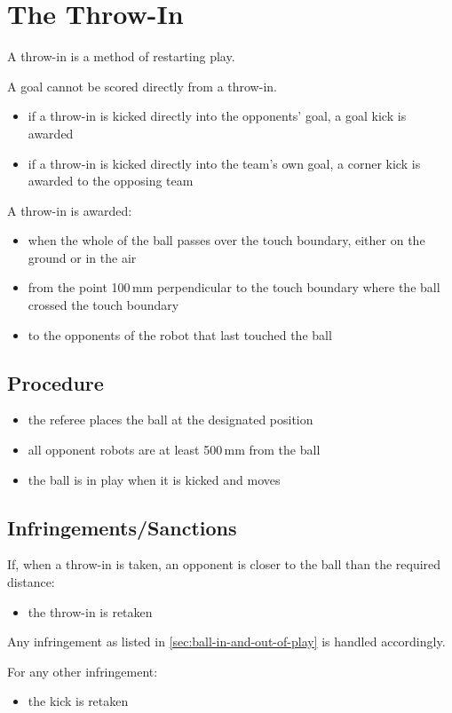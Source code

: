 \section{The Throw-In}\label{sec:throw-in}

A throw-in is a method of restarting play.

A goal cannot be scored directly from a throw-in.

\begin{itemize}
\item if a throw-in is kicked directly into the opponents' goal, a goal kick is awarded
\item if a throw-in is kicked directly into the team's own goal, a corner kick is awarded to the opposing team
\end{itemize}

A throw-in is awarded:

\begin{itemize}
\item when the whole of the ball passes over the touch boundary, either on the ground or in the air
\item from the point 100\,mm perpendicular to the touch boundary where the ball crossed the touch boundary
\item to the opponents of the robot that last touched the ball
\end{itemize}

\subsection{Procedure}
\begin{itemize}
\item the referee places the ball at the designated position
\item all opponent robots are at least 500\,mm from the ball
\item the ball is in play when it is kicked and moves
\end{itemize}

\subsection{Infringements/Sanctions}
If, when a throw-in is taken, an opponent is closer to the ball than the required distance:

\begin{itemize}
\item the throw-in is retaken
\end{itemize}

Any infringement as listed in \autoref{sec:ball-in-and-out-of-play} is handled accordingly.

For any other infringement:

\begin{itemize}
\item the kick is retaken
\end{itemize}